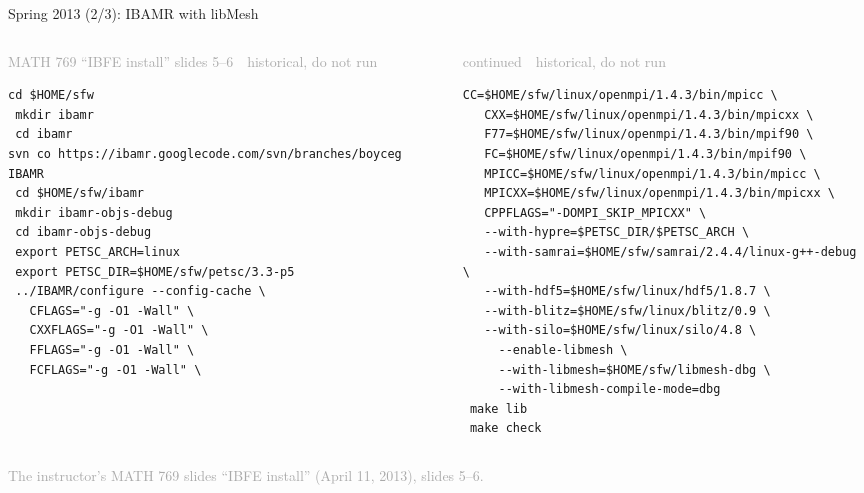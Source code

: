 \documentclass[aspectratio=169,11pt]{beamer}
\newcommand{\sourcecredit}[1]{\vfill\begin{flushright}\tiny\textcolor{DarkGray}{#1}\end{flushright}}
\newcommand{\hist}[1]{{\tiny\sffamily\textcolor{DarkGray}{#1\ \textbullet\ historical, do not run}}\par\nointerlineskip\vspace{0.3mm}}
\begin{document}
\begin{frame}[fragile]{Spring 2013 (2/3): IBAMR with libMesh}
\label{fr:ibfe2013}
\begin{columns}[T,onlytextwidth]
\begin{column}{0.48\textwidth}
\hist{MATH 769 ``IBFE install'' slides 5--6}
\begin{lstlisting}[style=hist]
 cd $HOME/sfw
 mkdir ibamr
 cd ibamr
svn co https://ibamr.googlecode.com/svn/branches/boyceg IBAMR
 cd $HOME/sfw/ibamr
 mkdir ibamr-objs-debug
 cd ibamr-objs-debug
 export PETSC_ARCH=linux
 export PETSC_DIR=$HOME/sfw/petsc/3.3-p5
 ../IBAMR/configure --config-cache \
   CFLAGS="-g -O1 -Wall" \
   CXXFLAGS="-g -O1 -Wall" \
   FFLAGS="-g -O1 -Wall" \
   FCFLAGS="-g -O1 -Wall" \
\end{lstlisting}
\end{column}
\begin{column}{0.49\textwidth}
\hist{continued}
\begin{lstlisting}[style=hist]
   CC=$HOME/sfw/linux/openmpi/1.4.3/bin/mpicc \
   CXX=$HOME/sfw/linux/openmpi/1.4.3/bin/mpicxx \
   F77=$HOME/sfw/linux/openmpi/1.4.3/bin/mpif90 \
   FC=$HOME/sfw/linux/openmpi/1.4.3/bin/mpif90 \
   MPICC=$HOME/sfw/linux/openmpi/1.4.3/bin/mpicc \
   MPICXX=$HOME/sfw/linux/openmpi/1.4.3/bin/mpicxx \
   CPPFLAGS="-DOMPI_SKIP_MPICXX" \
   --with-hypre=$PETSC_DIR/$PETSC_ARCH \
   --with-samrai=$HOME/sfw/samrai/2.4.4/linux-g++-debug \
   --with-hdf5=$HOME/sfw/linux/hdf5/1.8.7 \
   --with-blitz=$HOME/sfw/linux/blitz/0.9 \
   --with-silo=$HOME/sfw/linux/silo/4.8 \
     --enable-libmesh \
     --with-libmesh=$HOME/sfw/libmesh-dbg \
     --with-libmesh-compile-mode=dbg
 make lib
 make check
\end{lstlisting}
\end{column}
\end{columns}
\sourcecredit{The instructor's MATH 769 slides ``IBFE install'' (April 11, 2013), slides 5--6.}
\end{frame}
\end{document}
